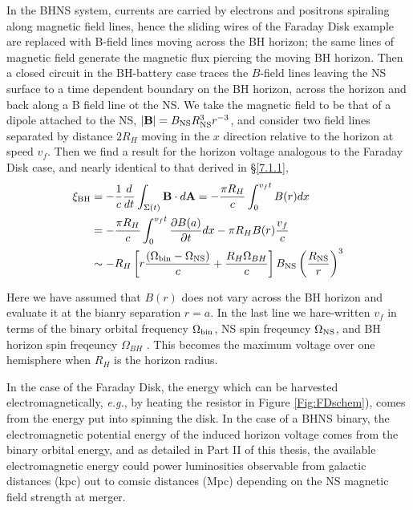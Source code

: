 In the BHNS system, currents are carried by electrons and positrons spiraling
along magnetic field lines, hence the sliding wires of the Faraday Disk
example are replaced with B-field lines moving across the BH horizon; the same
lines of magnetic field generate the magnetic flux piercing the moving BH
horizon. Then a closed circuit in the BH-battery case traces the $B$-field lines
leaving the NS surface to a time dependent boundary on the BH horizon, across
the horizon and back along a B field line ot the NS. We take the magnetic field
to be that of a dipole attached to the NS, $|{\bf B}| = B_{\rm NS} R^3_{\rm NS}
r^{-3}$, and consider two field lines separated by distance $2R_H$ moving in the
$x$ direction relative to the horizon at speed $v_f$. Then we find a result
for the horizon voltage analogous to the Faraday Disk case, and nearly
identical to that derived in \S \ref{7.1.1},
\begin{align}
\xi_{\rm BH} &= - \frac{1}{c}\frac{d}{dt} \int_{\Sigma(t)}{{\bf B} \cdot d{\bf A}} =  - \frac{\pi R_H}{c} \int^{v_f t}_{0} {B(r) dx}  \\
&=  - \frac{\pi R_H}{c}  \int^{v_f t}_{0}{ \frac{\partial B(a)}{\partial t} dx}  - \pi R_H B(r) \frac{v_f}{c}    \\
& \sim    -R_H \left[r \frac{\left(\Omega_{\rm bin}  - \Omega_{\rm NS}\right)}{c} + \frac{R_H\Omega_{BH}}{c}\right] B_{\rm NS}  \left( \frac{R_{\rm NS}}{r} \right)^3
\end{align}

 Here we have assumed that $B(r)$ does not vary across the BH horizon and
evaluate it at the bianry separation $r=a$. In the last line we hare-written
$v_f$ in terms of the binary orbital frequency $\Omega_{\rm bin}$, NS spin
freqeuncy $\Omega_{\rm NS}$, and BH horizon spin freqeuncy $\Omega_{BH}$
\citep[see][]{McL:2011}. This becomes the maximum voltage over one hemisphere
when $R_H$ is the horizon radius. 

In the case of the Faraday Disk, the energy which can be harvested
electromagnetically, \emph{e.g.}, by heating the resistor in Figure
\ref{Fig:FDschem}), comes from the energy put into spinning
the disk. In the case of a BHNS binary, the electromagnetic potential energy
of the induced horizon voltage comes from the binary orbital energy, and as
detailed in Part II of this thesis, the available electromagnetic energy could
power luminosities observable from galactic distances (kpc) out to comsic
distances (Mpc) depending on the NS magnetic field strength at merger.


